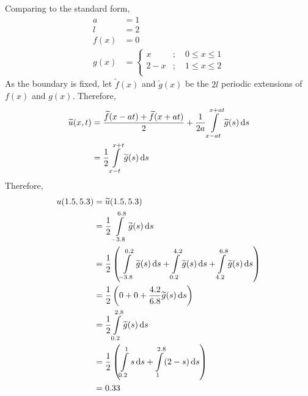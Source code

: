 \documentclass[titlepage, fleqn, a4paper, 12pt, twoside]{article}
\theoremstyle{definition}
\theoremstyle{theorem}
\renewcommand{\tilde}{\widetilde}
\begin{document}
\begin{solution}
	Comparing to the standard form,
	\begin{align*}
		a &= 1\\
		l &= 2\\
		f(x) &= 0\\
		g(x) &=
			\begin{cases}
				x     & ;\quad 0 \le x \le 1 \\
				2 - x & ;\quad 1 \le x \le 2 \\
			\end{cases}
	\end{align*}
	As the boundary is fixed, let $\tilde{f}(x)$ and $\tilde{g}(x)$ be the $2 l$ periodic extensions of $f(x)$ and $g(x)$.
	Therefore,
	\begin{align*}
		\tilde{u}(x,t) & = \frac{\tilde{f}(x - a t) + \tilde{f}(x + a t)}{2} + \frac{1}{2 a} \int\limits_{x - a t}^{x + a t} \tilde{g}(s) \dif s \\
                               & = \frac{1}{2} \int\limits_{x - t}^{x + t} \tilde{g}(s) \dif s
	\end{align*}
	Therefore,
	\begin{align*}
		u(1.5,5.3) & = \tilde{u}(1.5,5.3)                                                                                                                                                  \\
                           & = \frac{1}{2} \int\limits_{-3.8}^{6.8} \tilde{g}(s) \dif s                                                                                                            \\
                           & = \frac{1}{2} \left( \int\limits_{-3.8}^{0.2} \tilde{g}(s) \dif s + \int\limits_{0.2}^{4.2} \tilde{g}(s) \dif s + \int\limits_{4.2}^{6.8} \tilde{g}(s) \dif s \right) \\
                           & = \frac{1}{2} \left( 0 + 0 + \frac{4.2}{6.8} \tilde{g}(s) \dif s \right)                                                                                              \\
                           & = \frac{1}{2} \int\limits_{0.2}^{2.8} \tilde{g}(s) \dif s                                                                                                             \\
                           & = \frac{1}{2} \left( \int\limits_{0.2}^{1} s \dif s + \int\limits_{1}^{2.8} (2 - s) \dif s \right)                                                                    \\
                           & = 0.33
	\end{align*}
\end{solution}
\end{document}
